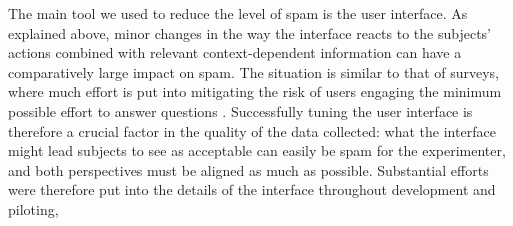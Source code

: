 \documentclass[a4paper,fleqn]{cas-dc}
\begin{document}
The main tool we used to reduce the level of spam is the user interface.
As explained above, minor changes in the way the interface reacts to the
subjects' actions combined with relevant context-dependent information
can have a comparatively large impact on spam.
The situation is similar to that of surveys, where much effort is put
into mitigating the risk of users engaging the minimum possible effort
to answer questions \citep{krosnick_threat_2000}. Successfully
tuning the user interface is therefore a crucial factor in the quality
of the data collected: what the interface might lead subjects to see as
acceptable can easily be spam for the experimenter, and both
perspectives must be aligned as much as possible.
Substantial efforts were therefore put into the details of the interface throughout development and piloting,
\end{document}

